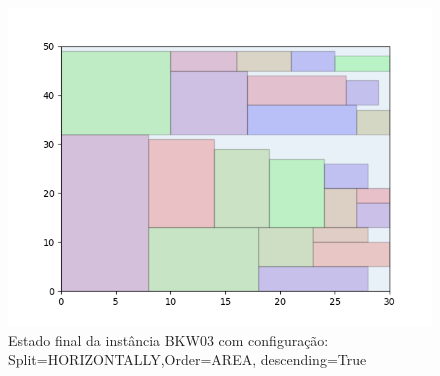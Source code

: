 \begin{figure}[H]
    \centering
    \caption[]{Estado final da instância BKW03 com configuração: Split=HORIZONTALLY,Order=AREA, descending=True}
    \label{fig:bkw03-horizontally-area-true}
    \includegraphics[scale=0.5]{output/figures/bkw/bkw03/horizontally/area/true/00}
\end{figure}